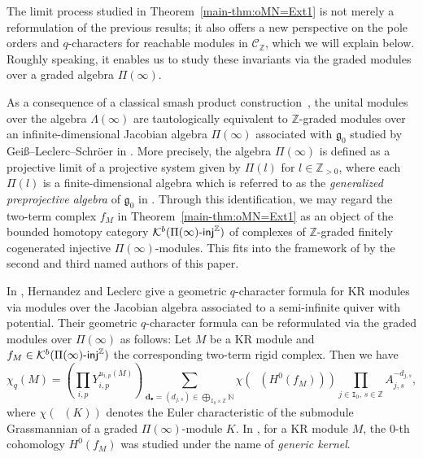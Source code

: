 \documentclass[12pt]{amsart}
\theoremstyle{definition}
\theoremstyle{remark}
\numberwithin{equation}{section}
\newcommand{\injc}{\mathchar`-\mathsf{inj}}
\begin{document}
The limit process studied in Theorem~\ref{main-thm:oMN=Ext1} is not merely a reformulation of the previous results; it also offers a new perspective on the pole orders and $q$-characters for reachable modules in $\mathcal{C}_\mathbb{Z}$, which we will explain below. Roughly speaking, it enables us to study these invariants via the graded modules over a graded algebra $\Pi(\infty)$.

As a consequence of a classical smash product construction~\cite{CM84,Bea88}, the unital modules over the algebra $\Lambda(\infty)$ are tautologically equivalent to $\mathbb{Z}$-graded modules over an infinite-dimensional Jacobian algebra $\Pi(\infty)$ associated with $\mathfrak{g}_0$ studied by Gei\ss--Leclerc--Schr\"oer in \cite{GLS-2017}.
More precisely,  the algebra $\Pi(\infty)$ is defined as a projective limit of a projective system given by $\Pi(l)$ for $l \in \mathbb{Z}_{>0}$, where each $\Pi(l)$ is a finite-dimensional algebra which is referred to as the {\em generalized preprojective algebra} of $\mathfrak{g}_0$ in \cite{GLS-2017}.
Through this identification, we may regard the two-term complex $f_M$ in Theorem~\ref{main-thm:oMN=Ext1} as an object of the bounded homotopy category $\mathcal{K}^b(\Pi(\infty)\injc^\mathbb{Z})$ of complexes of $\mathbb{Z}$-graded finitely cogenerated injective $\Pi(\infty)$-modules. This fits into the framework of \cite{FM} by the second and third named authors of this paper.



In \cite[\S4]{HL16}, Hernandez and Leclerc give a geometric $q$-character formula for KR modules via modules over the Jacobian algebra associated to a  semi-infinite quiver with potential. Their geometric $q$-character formula can be reformulated via the graded modules over $\Pi(\infty)$ as follows:
Let $M$ be a KR module and  $f_M\in \mathcal{K}^b(\Pi(\infty)\injc^\mathbb{Z})$ the corresponding two-term rigid complex. 
Then we have
\begin{equation} \label{eq:gqchintro}
\chi_q(M)= \left(\prod_{i,p}Y_{i,p}^{u_{i,p}(M)}\right) \sum_{\mathbf d_\bullet=(d_{j,s}) \in \bigoplus_{\mathtt I_0\times\mathbb Z} \mathbb N} \chi\left(\mathop{\mathsf{Gr}^{\mathbb Z}_{\mathbf d_\bullet}}(H^0(f_M))\right) \prod_{j\in\mathtt I_0,\,s\in\mathbb Z} A_{j,s}^{-d_{j,s}},
\end{equation}
where $\chi(\mathop{\mathsf{Gr}^{\mathbb{Z}}_{\mathbf{d}_{\bullet}}}(K))$ denotes the Euler characteristic of the submodule Grassmannian of a graded $\Pi(\infty)$-module $K$.
In \cite{HL16}, for a KR module $M$, the $0$-th cohomology $H^0 (f_M)$ was studied under the name of {\em generic kernel}.
\end{document}
